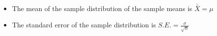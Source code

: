 \begin{itemize}
	\item The mean of the sample distribution of the sample means is $\bar{\bar{X}}=\mu$
	\item The standard error of the sample distribution is $S.E. = \frac{\sigma}{\sqrt{n}}$
\end{itemize}
